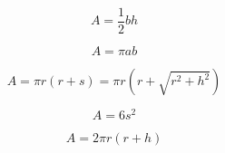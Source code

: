 \[\begin{equation} A = \frac{1}{2} b h \end{equation}\]

\[\begin{equation} A = \pi a b \end{equation}\]

\[\begin{equation} A = \pi r \left( r + s \right) = \pi r \left( r + \sqrt{r^2 + h^2} \right) \end{equation}\]

\[\begin{equation} A = 6 s^2 \end{equation}\]

\[\begin{equation} A = 2 \pi r \left( r + h \right) \end{equation}\]

